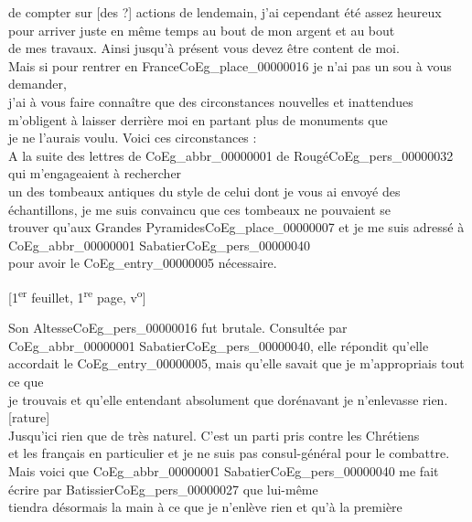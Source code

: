 \documentclass{book}
\begin{document}
de compter sur {[des ?]} actions de lendemain, j’ai cependant été assez heureux\\
pour arriver juste en même temps au bout de mon argent et au bout\\
de mes travaux. Ainsi jusqu’à présent vous devez être content de moi.\\
\indent Mais si pour rentrer en France\gls{CoEg_place_00000016} je n’ai pas un sou à vous demander,\\
j’ai à vous faire connaître que des circonstances nouvelles et inattendues\\
m’obligent à laisser derrière moi en partant plus de monuments que\\
je ne l’aurais voulu. Voici ces circonstances :\\
\indent A la suite des lettres de \gls{CoEg_abbr_00000001} de Rougé\gls{CoEg_pers_00000032} qui m’engageaient à rechercher\\
un des tombeaux antiques du style de celui dont je vous ai envoyé des\\
échantillons, je me suis convaincu que ces tombeaux ne pouvaient se\\
trouver qu’aux Grandes Pyramides\gls{CoEg_place_00000007} et je me suis adressé à \gls{CoEg_abbr_00000001} Sabatier\gls{CoEg_pers_00000040}\\
pour avoir le \gls{CoEg_entry_00000005} nécessaire.
{\footnotesize\begin{center} {[1\textsuperscript{er} feuillet, 1\textsuperscript{re} page, v\textsuperscript{o}]}\end{center}}
\indent Son Altesse\gls{CoEg_pers_00000016} fut brutale. Consultée par \gls{CoEg_abbr_00000001} Sabatier\gls{CoEg_pers_00000040}, elle répondit qu’elle\\
accordait le \gls{CoEg_entry_00000005}, mais qu’elle savait que je m’appropriais tout ce que\\
je trouvais et qu’elle entendant absolument que dorénavant je n’enlevasse rien. [rature]\\
\indent Jusqu’ici rien que de très naturel. C’est un parti pris contre les Chrétiens\\
et les français en particulier et je ne suis pas consul-général pour le combattre.\\
\indent Mais voici que \gls{CoEg_abbr_00000001} Sabatier\gls{CoEg_pers_00000040} me fait écrire par Batissier\gls{CoEg_pers_00000027} que lui-même\\
tiendra désormais la main à ce que je n’enlève rien et qu’à la première\\
\end{document}
